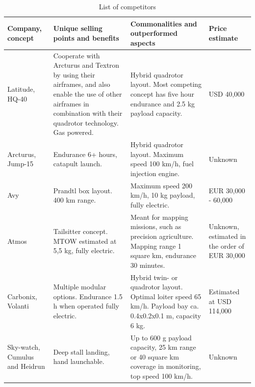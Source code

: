 \begin{table}[hbt]
    \centering
    \caption{List of competitors}
    \label{tab:list_comp}
    \begin{tabularx}{\textwidth}{>{\small}p{} L  L >{\small}p{.12\textwidth} }
    \toprule
    \textbf{Company, concept}     & \textbf{Unique selling points and benefits} & \textbf{Commonalities and outperformed aspects}  &\textbf{Price estimate} 
    \\ \midrule
    Latitude, HQ-40\footnotemark    & Cooperate with Arcturus and Textron by using their airframes, and also enable the use of other airframes in combination with their quadrotor technology. Gas powered. & Hybrid quadrotor layout. Most competing concept has five hour endurance and 2.5 kg payload capacity. & USD 40,000\footnotemark
    \\ \hdashline
    Arcturus, Jump-15\footnotemark & Endurance 6+ hours, catapult launch. & Hybrid quadrotor layout. Maximum speed 100 km/h, fuel injection engine. & Unknown
    \\ \hdashline
    Avy         & Prandtl box layout. 400 km range. & Maximum speed 200 km/h, 10 kg payload, fully electric\footnotemark. & EUR 30,000 - 60,000\footnotemark
    \\ \hdashline
    Atmos       & Tailsitter concept. MTOW estimated at 5,5 kg\footnotemark, fully electric. & Meant for mapping missions, such as precision agriculture. Mapping range 1 square km, endurance 30 minutes. & Unknown, estimated in the order of EUR 30,000
    \\ \hdashline
    Carbonix, Volanti\footnotemark    & Multiple modular options. Endurance 1.5 h when operated fully electric.& Hybrid twin- or quadrotor layout. Optimal loiter speed 65 km/h. Payload bay ca. 0.4x0.2x0.1 m, capacity 6 kg. & Estimated at USD 114,000\footnotemark
    \\ \hdashline
    Sky-watch, Cumulus and Heidrun\footnotemark   & Deep stall landing, hand launchable.  & Up to 600 g payload capacity, 25 km range or 40 square km coverage in monitoring, top speed 100 km/h. & Unknown
    \\ \bottomrule
    \end{tabularx}
\end{table}

